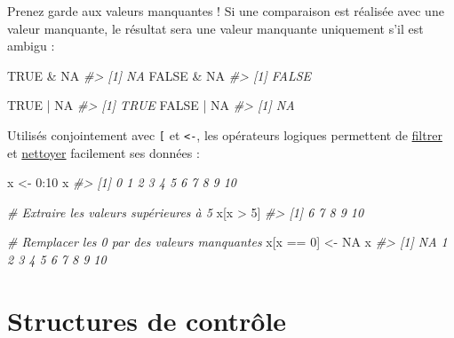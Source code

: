 \documentclass[
  french,
]{scrbook}
\newenvironment{Shaded}{\begin{snugshade}}{\end{snugshade}}
\newcommand{\CommentTok}[1]{\textcolor[rgb]{0.56,0.35,0.01}{\textit{#1}}}
\newcommand{\ConstantTok}[1]{\textcolor[rgb]{0.00,0.00,0.00}{#1}}
\newcommand{\DecValTok}[1]{\textcolor[rgb]{0.00,0.00,0.81}{#1}}
\newcommand{\NormalTok}[1]{#1}
\newcommand{\OtherTok}[1]{\textcolor[rgb]{0.56,0.35,0.01}{#1}}
\newcommand{\SpecialCharTok}[1]{\textcolor[rgb]{0.00,0.00,0.00}{#1}}
\begin{document}
\begin{tcolorbox}[fonttitle=\sffamily\bfseries\large,title=Avertissement,colframe=darkyellow]

Prenez garde aux valeurs manquantes ! Si une comparaison est réalisée avec une valeur manquante, le résultat sera une valeur manquante uniquement s'il est ambigu :

\begin{Shaded}
\begin{Highlighting}[]
\ConstantTok{TRUE} \SpecialCharTok{\&} \ConstantTok{NA}
\CommentTok{\#\textgreater{} [1] NA}
\ConstantTok{FALSE} \SpecialCharTok{\&} \ConstantTok{NA}
\CommentTok{\#\textgreater{} [1] FALSE}

\ConstantTok{TRUE} \SpecialCharTok{|} \ConstantTok{NA}
\CommentTok{\#\textgreater{} [1] TRUE}
\ConstantTok{FALSE} \SpecialCharTok{|} \ConstantTok{NA}
\CommentTok{\#\textgreater{} [1] NA}
\end{Highlighting}
\end{Shaded}

\end{tcolorbox}

Utilisés conjointement avec \texttt{{[}} et \texttt{\textless{}-}, les opérateurs logiques permettent de \protect\hyperlink{data-filtrer}{filtrer} et \protect\hyperlink{data-nettoyer}{nettoyer} facilement ses données :

\begin{Shaded}
\begin{Highlighting}[]
\NormalTok{x }\OtherTok{\textless{}{-}} \DecValTok{0}\SpecialCharTok{:}\DecValTok{10}
\NormalTok{x}
\CommentTok{\#\textgreater{}  [1]  0  1  2  3  4  5  6  7  8  9 10}

\CommentTok{\# Extraire les valeurs supérieures à 5}
\NormalTok{x[x }\SpecialCharTok{\textgreater{}} \DecValTok{5}\NormalTok{]}
\CommentTok{\#\textgreater{} [1]  6  7  8  9 10}

\CommentTok{\# Remplacer les 0 par des valeurs manquantes}
\NormalTok{x[x }\SpecialCharTok{==} \DecValTok{0}\NormalTok{] }\OtherTok{\textless{}{-}} \ConstantTok{NA}
\NormalTok{x}
\CommentTok{\#\textgreater{}  [1] NA  1  2  3  4  5  6  7  8  9 10}
\end{Highlighting}
\end{Shaded}

\hypertarget{structures-de-contruxf4le}{%
\chapter{Structures de contrôle}\label{structures-de-contruxf4le}}
\end{document}
